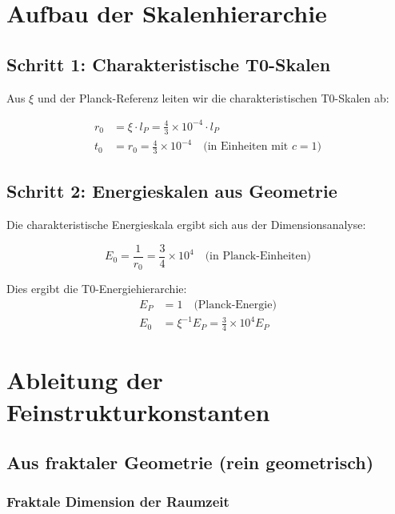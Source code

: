 \documentclass[12pt,a4paper]{article}
\newcommand{\lP}{l_P}
\newcommand{\EP}{E_P}
\newcommand{\rzero}{r_0}
\newcommand{\tzero}{t_0}
\newcommand{\Ezero}{E_0}
\newcommand{\xipar}{\xi}
\begin{document}
	\section{Aufbau der Skalenhierarchie}
	
	\subsection{Schritt 1: Charakteristische T0-Skalen}
	
	Aus $\xipar$ und der Planck-Referenz leiten wir die charakteristischen T0-Skalen ab:
	
	\begin{align}
		\rzero &= \xipar \cdot \lP = \frac{4}{3} \times 10^{-4} \cdot \lP \\
		\tzero &= \rzero = \frac{4}{3} \times 10^{-4} \quad \text{(in Einheiten mit } c=1\text{)}
	\end{align}
	
	\subsection{Schritt 2: Energieskalen aus Geometrie}
	
	Die charakteristische Energieskala ergibt sich aus der Dimensionsanalyse:
	
	\begin{equation}
		\Ezero = \frac{1}{\rzero} = \frac{3}{4} \times 10^{4} \quad \text{(in Planck-Einheiten)}
	\end{equation}
	
	Dies ergibt die T0-Energiehierarchie:
	\begin{align}
		\EP &= 1 \quad \text{(Planck-Energie)} \\
		\Ezero &= \xipar^{-1} \EP = \frac{3}{4} \times 10^{4} \EP
	\end{align}
	
	\section{Ableitung der Feinstrukturkonstanten}
	
	\subsection{Aus fraktaler Geometrie (rein geometrisch)}
	
	\subsubsection{Fraktale Dimension der Raumzeit}
	
\end{document}
